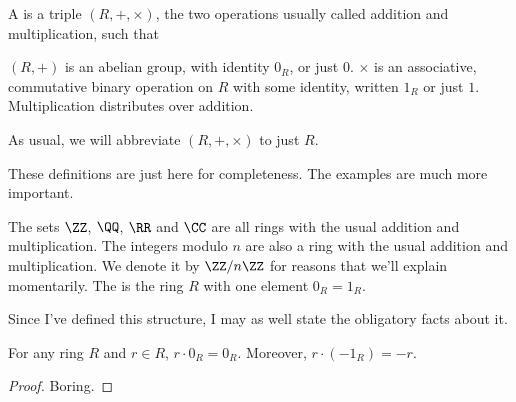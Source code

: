\begin{definition}
	A  is a triple $(R, +, \times)$, the two operations usually called addition and multiplication, such that
	\begin{enumerate}[(i)]
		\ii $(R,+)$ is an abelian group, with identity $0_R$, or just $0$.
		\ii $\times$ is an associative, commutative binary operation on $R$ with some
		identity, written $1_R$ or just $1$.
		\ii Multiplication distributes over addition.
	\end{enumerate}
\end{definition}
\begin{abuse}
	As usual, we will abbreviate $(R, +, \times)$ to just $R$.
\end{abuse}

These definitions are just here for completeness.
The examples are much more important.
\begin{example}
	\listhack
	\begin{enumerate}[(a)]
		\ii The sets $\ZZ$, $\QQ$, $\RR$ and $\CC$ are all rings
		with the usual addition and multiplication.
		\ii The integers modulo $n$ are also a ring
		with the usual addition and multiplication.
		We denote it by $\ZZ / n\ZZ$ for reasons that we'll explain momentarily.
		\ii The  is the ring $R$ with one element $0_R = 1_R$.
	\end{enumerate}
\end{example}

Since I've defined this structure, I may as well state the obligatory facts about it.
\begin{fact}
	For any ring $R$ and $r \in R$, $r \cdot 0_R = 0_R$.
	Moreover, $r \cdot (-1_R) = -r$.
\end{fact}
\begin{proof}
	Boring.
\end{proof}

